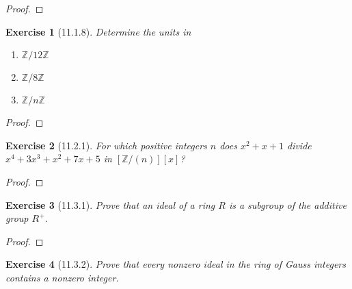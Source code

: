 \documentclass[12pt]{article}
\newtheorem*{exer}{Exercise}
\begin{document}
\begin{proof}
\end{proof}


\begin{exer}[11.1.8]

    Determine the units in

    \begin{enumerate}
        \item $\mathbb{Z}/12\mathbb{Z}$
        \item $\mathbb{Z}/8\mathbb{Z}$
        \item $\mathbb{Z}/n\mathbb{Z}$
    \end{enumerate}

\end{exer}

\begin{proof}
\end{proof}


\begin{exer}[11.2.1]

    For which positive integers $n$ does $x^2 + x + 1$ divide $x^4 +
    3x^3 + x^2 + 7x + 5$ in $[\mathbb{Z}/(n)][x]$?

\end{exer}

\begin{proof}
\end{proof}


\begin{exer}[11.3.1]

    Prove that an ideal of a ring $R$ is a subgroup of the additive
    group $R^+$.

\end{exer}

\begin{proof}
\end{proof}


\begin{exer}[11.3.2]

    Prove that every nonzero ideal in the ring of Gauss integers
    contains a nonzero integer.

\end{exer}
\end{document}
